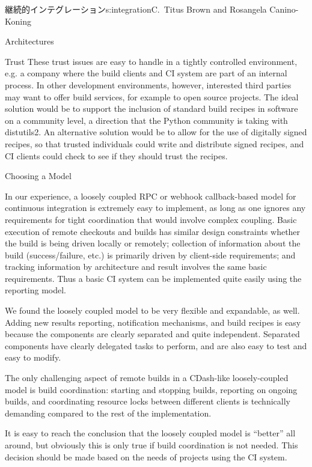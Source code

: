 \begin{aosachapter}{継続的インテグレーション}{s:integration}{C.\ Titus Brown and Rosangela Canino-Koning}
\begin{aosasect1}{Architectures}
\begin{aosasect2}{Trust}
These trust issues are easy to handle in a tightly controlled
environment, e.g. a company where the build clients and CI system are
part of an internal process. In other development environments,
however, interested third parties may want to offer build services,
for example to open source projects. The ideal solution would be to
support the inclusion of standard build recipes in software on a
community level, a direction that the Python community is taking with
distutils2. An alternative solution would be to allow for the use of
digitally signed recipes, so that trusted individuals could write and
distribute signed recipes, and CI clients could check to see if they
should trust the recipes.

\end{aosasect2}

\begin{aosasect2}{Choosing a Model}

In our experience, a loosely coupled RPC or webhook callback-based
model for continuous integration is extremely easy to implement, as
long as one ignores any requirements for tight coordination that would
involve complex coupling. Basic execution of remote checkouts and
builds has similar design constraints whether the build is being
driven locally or remotely; collection of information about the build
(success/failure, etc.) is primarily driven by client-side
requirements; and tracking information by architecture and result
involves the same basic requirements.  Thus a basic CI system can be
implemented quite easily using the reporting model.

We found the loosely coupled model to be very flexible and expandable,
as well. Adding new results reporting, notification mechanisms, and
build recipes is easy because the components are clearly separated and
quite independent. Separated components have clearly delegated tasks
to perform, and are also easy to test and easy to modify.

The only challenging aspect of remote builds in a CDash-like
loosely-coupled model is build coordination: starting and stopping
builds, reporting on ongoing builds, and coordinating resource locks
between different clients is technically demanding compared to the
rest of the implementation.

It is easy to reach the conclusion that the loosely coupled model is
``better'' all around, but obviously this is only true if build
coordination is not needed.  This decision should be made based on the
needs of projects using the CI system.


\end{aosasect2}
\end{aosasect1}
\end{aosachapter}
